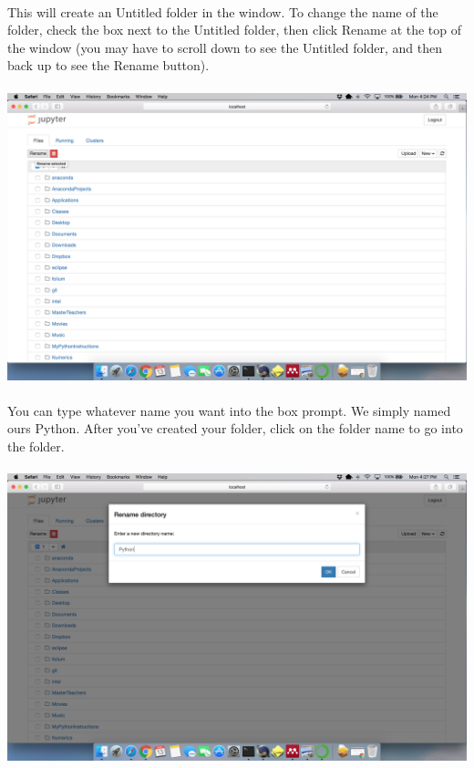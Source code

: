\documentclass[]{article}
\begin{document}
\paragraph{}
This will create an Untitled folder in the window. To change the name of the folder, check the box next to the Untitled folder, then click Rename at the top of the window (you may have to scroll down to see the Untitled folder, and then back up to see the Rename button).
\paragraph{}
\begin{centering}
    \centerline{\includegraphics[scale=0.25]{Screenshot_18.png}}
\end{centering}

\clearpage
\paragraph{}
You can type whatever name you want into the box prompt. We simply named ours Python. After you've created your folder, click on the folder name to go into the folder.
\paragraph{}
\begin{centering}
    \centerline{\includegraphics[scale=0.25]{Screenshot_19.png}}
\end{centering}
\end{document}
